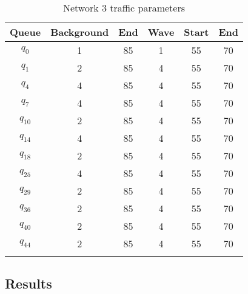 \begin{table}[h]
\caption{Network 3 traffic parameters}
\label{tab:net3wave}
\centering
\begin{tabular}{cccccc}
\toprule
Queue & Background & End & Wave & Start &End\\ 
\midrule
$q_0$ & 1 & 85 & 1 & 55 & 70\\
$q_1$ & 2 & 85 & 4 & 55 & 70\\
$q_4$ & 4 & 85 & 4 & 55 & 70\\
$q_7$ & 4 & 85 & 4 & 55 & 70\\
$q_{10}$ & 2 & 85 & 4 & 55 & 70\\
$q_{14}$ & 4 & 85 & 4 & 55 & 70\\
$q_{18}$ & 2 & 85 & 4 & 55 & 70\\
$q_{25}$ & 4 & 85 & 4 & 55 & 70\\
$q_{29}$ & 2 & 85 & 4 & 55 & 70\\
$q_{36}$ & 2 & 85 & 4 & 55 & 70\\
$q_{40}$ & 2 & 85 & 4 & 55 & 70\\
$q_{44}$ & 2 & 85 & 4 & 55 & 70\\
\bottomrule\\
\end{tabular}
\end{table}

\subsection{Results}

